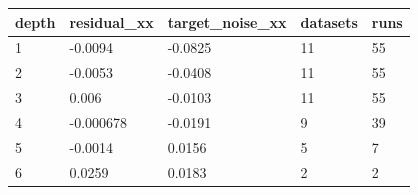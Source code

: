 \begin{tabular}{lllll}
\toprule
depth & residual\_xx & target\_noise\_xx & datasets & runs \\
\midrule
1 & -0.0094 & -0.0825 & 11 & 55 \\
2 & -0.0053 & -0.0408 & 11 & 55 \\
3 & 0.006 & -0.0103 & 11 & 55 \\
4 & -0.000678 & -0.0191 & 9 & 39 \\
5 & -0.0014 & 0.0156 & 5 & 7 \\
6 & 0.0259 & 0.0183 & 2 & 2 \\
\bottomrule
\end{tabular}
